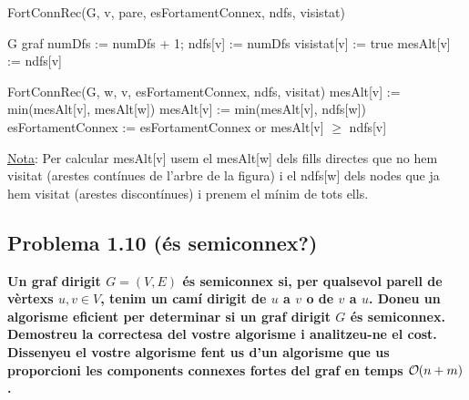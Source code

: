 \documentclass[a4paper,12pt]{article}
\DeclareRobustCommand{\bigO}{%
  \text{\usefont{OMS}{cmsy}{m}{n}O}%
}
\begin{document}
\begin{algorithm}[H]
    \caption{FortConnRec(G, v, pare, esFortamentConnex, ndfs, visistat)}
    \begin{algorithmic}[1]  %
        \Require G graf
        \State numDfs := numDfs + 1; ndfs[v] := numDfs
        \State visistat[v] := true
        \State mesAlt[v] := ndfs[v]

        \State
        
                \State FortConnRec(G, w, v, esFortamentConnex, ndfs, visitat)
                \State mesAlt[v] := min(mesAlt[v], mesAlt[w])
            \Else
                \State mesAlt[v] := min(mesAlt[v], ndfs[w])
            \EndIf
        \EndFor
        \State
            \State  esFortamentConnex := esFortamentConnex or mesAlt[v] $\geq$ ndfs[v]
        \EndIf
    \end{algorithmic}
\end{algorithm}

\underline{Nota}: Per calcular mesAlt[v] usem el mesAlt[w] dels fills directes que no hem visitat (arestes contínues de l'arbre de la figura) i el ndfs[w] dels nodes que ja hem visitat (arestes discontínues) i prenem el mínim de tots ells.

\subsection*{Problema 1.10 (és semiconnex?)}
\textbf{Un graf dirigit $G = (V, E)$ és semiconnex si, per qualsevol parell de vèrtexs $u, v \in V$, tenim un camí dirigit de $u$ a $v$ o de $v$ a $u$.
Doneu un algorisme eficient per determinar si un graf dirigit $G$ és semiconnex. Demostreu la correctesa del vostre algorisme i analitzeu-ne el cost. Dissenyeu el vostre algorisme fent us d'un algorisme que us proporcioni les components connexes fortes del graf en temps $\bigO(n + m)$.}

\newpage
\end{document}
